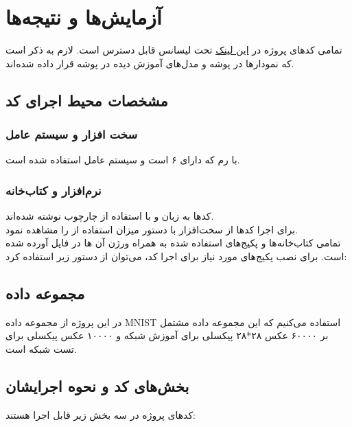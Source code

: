 \chapter{آزمایش‌ها و نتیجه‌ها}
\thispagestyle{empty}

تمامی کد‌های پروژه در 
\href{https://github.com/yegmor/Final_Project}{این لینک}
تحت لیسانس 
\href{https://choosealicense.com/licenses/mit/}{}
قابل دسترس است.
لازم به ذکر است که نمودار‌ها در پوشه
\textbf{}
و مدل‌های آموزش دیده در پوشه
\textbf{}
قرار داده شده‌اند.

\section{مشخصات محیط اجرای کد}
\subsection{سخت افزار و سیستم عامل}
با رم 
که دارای ۶ 
است و سیستم عامل 
استفاده شده است.

\subsection{نرم‌افزار و کتاب‌خانه}
کد‌ها به زبان 
و با استفاده از چارچوب
 
نوشته شده‌اند.
\\
برای اجرا کدها از سخت‌افزار
با دستور 
میزان استفاده از 
را مشاهده نمود. 
\\
تمامی کتاب‌خانه‌ها و پکیج‌های استفاده شده به همراه ورژن آن ها در فایل 
آورده شده است. برای نصب پکیج‌های مورد نیاز برای اجرا کد، می‌توان از دستور زیر استفاده کرد:
\begin{latin}
\end{latin}

\section{مجموعه داده}
در این پروژه از مجموعه‌ داده MNIST استفاده می‌کنیم که این مجموعه‌ داده مشتمل بر ۶۰۰۰۰ عکس ۲۸*۲۸ پیکسلی برای آموزش شبکه و ۱۰۰۰۰ عکس
پیکسلی برای تست شبکه است.

\section{بخش‌های کد و نحوه‌ اجرایشان}
کدهای پروژه در سه بخش زیر قابل اجرا هستند:

